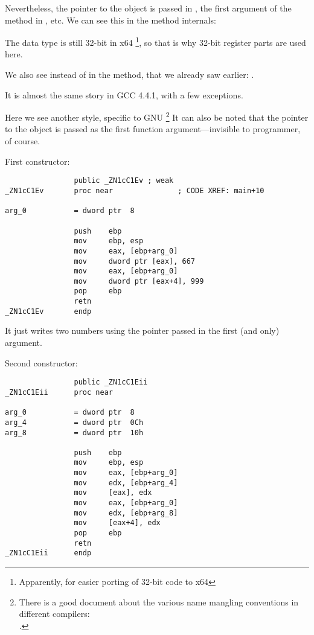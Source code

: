 Nevertheless, the \ITthis pointer to the object is passed in \RCX, the first argument of the method in \RDX, etc.
We can see this in the 
 method internals:



The \Tint data type is still 32-bit in x64
\footnote{Apparently, for easier porting of 32-bit \CCpp code to x64}, 
so that is why 32-bit register parts are used here.

We also see  instead of \RET in the  method, that  we already saw
earlier: .


It is almost the same story in GCC 4.4.1, with a few exceptions.



Here we see another  style, specific to GNU
\footnote{There is a good document about the various name mangling conventions in different compilers:\\
\InSqBrackets{\AgnerFogCC}.}
It can also be noted that the pointer to the object is passed as the first function 
argument---invisible to programmer, of course.

First constructor:

\begin{lstlisting}
                public _ZN1cC1Ev ; weak
_ZN1cC1Ev       proc near               ; CODE XREF: main+10

arg_0           = dword ptr  8

                push    ebp
                mov     ebp, esp
                mov     eax, [ebp+arg_0]
                mov     dword ptr [eax], 667
                mov     eax, [ebp+arg_0]
                mov     dword ptr [eax+4], 999
                pop     ebp
                retn
_ZN1cC1Ev       endp
\end{lstlisting}

It just writes two numbers using the pointer passed in the first (and only) argument.

Second constructor:

\begin{lstlisting}
                public _ZN1cC1Eii
_ZN1cC1Eii      proc near

arg_0           = dword ptr  8
arg_4           = dword ptr  0Ch
arg_8           = dword ptr  10h

                push    ebp
                mov     ebp, esp
                mov     eax, [ebp+arg_0]
                mov     edx, [ebp+arg_4]
                mov     [eax], edx
                mov     eax, [ebp+arg_0]
                mov     edx, [ebp+arg_8]
                mov     [eax+4], edx
                pop     ebp
                retn
_ZN1cC1Eii      endp
\end{lstlisting}

